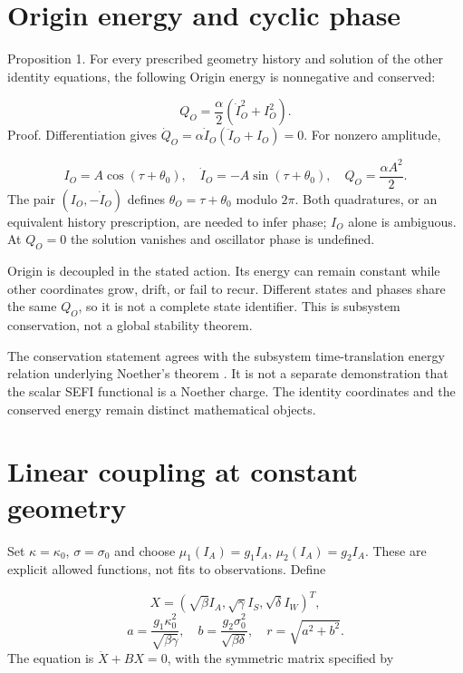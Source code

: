 \documentclass[aip,adv,preprint,floatfix]{revtex4-2}
\begin{document}
\section{Origin energy and cyclic phase}
Proposition 1. For every prescribed geometry history and solution of the other identity equations, the following Origin energy is nonnegative and conserved:

\begin{equation}
Q_O=\frac{\alpha}{2}(\dot I_O^2+I_O^2).
\end{equation}
Proof. Differentiation gives $\dot Q_O=\alpha\dot I_O(\ddot I_O+I_O)=0$. For nonzero amplitude,

\begin{equation}
I_O=A\cos(\tau+\theta_0),\quad \dot I_O=-A\sin(\tau+\theta_0),\quad Q_O=\frac{\alpha A^2}{2}.
\end{equation}
The pair $(I_O,-\dot I_O)$ defines $\theta_O=\tau+\theta_0$ modulo $2\pi$. Both quadratures, or an equivalent history prescription, are needed to infer phase; $I_O$ alone is ambiguous. At $Q_O=0$ the solution vanishes and oscillator phase is undefined.

Origin is decoupled in the stated action. Its energy can remain constant while other coordinates grow, drift, or fail to recur. Different states and phases share the same $Q_O$, so it is not a complete state identifier. This is subsystem conservation, not a global stability theorem.

The conservation statement agrees with the subsystem time-translation energy relation underlying Noether's theorem \cite{r11}. It is not a separate demonstration that the scalar SEFI functional is a Noether charge. The identity coordinates and the conserved energy remain distinct mathematical objects.

\section{Linear coupling at constant geometry}
Set $\kappa=\kappa_0$, $\sigma=\sigma_0$ and choose $\mu_1(I_A)=g_1I_A$, $\mu_2(I_A)=g_2I_A$. These are explicit allowed functions, not fits to observations. Define

\begin{equation}
X=(\sqrt{\beta}I_A,\sqrt{\gamma}I_S,\sqrt{\delta}I_W)^T,
\end{equation}
\begin{equation}
a=\frac{g_1\kappa_0^2}{\sqrt{\beta\gamma}},\quad b=\frac{g_2\sigma_0^2}{\sqrt{\beta\delta}},\quad r=\sqrt{a^2+b^2}.
\end{equation}
The equation is $\ddot X+BX=0$, with the symmetric matrix specified by
\end{document}
